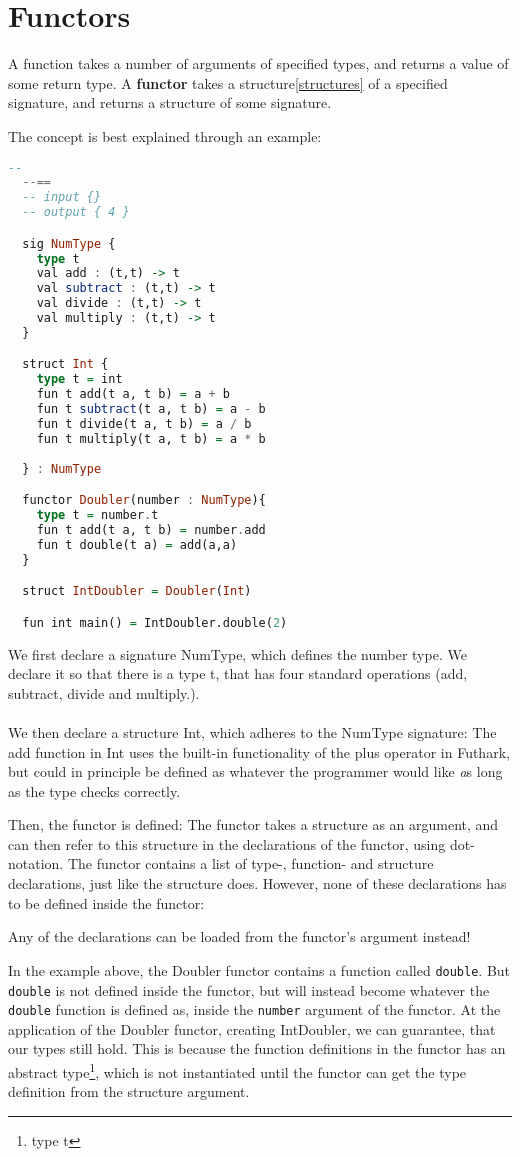 \section{Functors}
\label{sec:functors}
A function takes a number of arguments of specified types, and returns a value of some return type.
A \textbf{functor} takes a structure\ref{structures} of a specified signature,
and returns a structure of some signature.

The concept is best explained through an example:
\begin{lstlisting}[language=Haskell]
  --
  --==
  -- input {}
  -- output { 4 }

  sig NumType {
    type t
    val add : (t,t) -> t
    val subtract : (t,t) -> t
    val divide : (t,t) -> t
    val multiply : (t,t) -> t
  }

  struct Int {
    type t = int
    fun t add(t a, t b) = a + b
    fun t subtract(t a, t b) = a - b
    fun t divide(t a, t b) = a / b
    fun t multiply(t a, t b) = a * b
    
  } : NumType

  functor Doubler(number : NumType){
    type t = number.t
    fun t add(t a, t b) = number.add
    fun t double(t a) = add(a,a) 
  }

  struct IntDoubler = Doubler(Int)

  fun int main() = IntDoubler.double(2)
\end{lstlisting}
We first declare a signature NumType, which defines the number type. We declare it so
that there is a type t, that has four standard operations (add, subtract, divide
and multiply.).
\\
\\
We then declare a structure Int, which adheres to the NumType signature:
The add function in Int uses the built-in functionality of the plus operator in
Futhark, but could in principle be defined as whatever the programmer would
like \emph as long as the type checks correctly.

Then, the functor is defined: The functor takes a structure as an argument, and
can then refer to this structure in the declarations of the functor, using
dot-notation.
The functor contains a list of type-, function- and structure declarations, just
like the structure does.
However, none of these declarations has to be defined inside the functor:

Any of the declarations can be loaded from the functor's argument instead!

In the example above, the Doubler functor contains a function called
\texttt{double}. But \texttt{double} is not defined inside the functor, but will
instead become whatever the \texttt{double} function is defined as, inside the \texttt{number}
argument of the functor.
At the application of the Doubler functor, creating IntDoubler, we can
guarantee, that our types still hold. This is because the function definitions
in the functor has an abstract type\footnote{type t}, which is not instantiated
until the functor can get the type definition from the structure argument.

